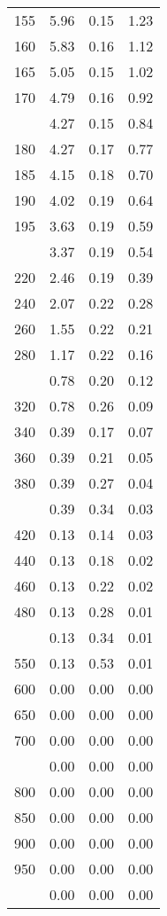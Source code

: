 \begin{table}[ht]
\begin{tabular}{lccc}
  155 & 5.96 & 0.15 & 1.23 \\ 
  160 & 5.83 & 0.16 & 1.12 \\ 
  165 & 5.05 & 0.15 & 1.02 \\ 
  170 & 4.79 & 0.16 & 0.92 \\ 
   \addlinespace
175 & 4.27 & 0.15 & 0.84 \\ 
  180 & 4.27 & 0.17 & 0.77 \\ 
  185 & 4.15 & 0.18 & 0.70 \\ 
  190 & 4.02 & 0.19 & 0.64 \\ 
  195 & 3.63 & 0.19 & 0.59 \\ 
   \addlinespace
200 & 3.37 & 0.19 & 0.54 \\ 
  220 & 2.46 & 0.19 & 0.39 \\ 
  240 & 2.07 & 0.22 & 0.28 \\ 
  260 & 1.55 & 0.22 & 0.21 \\ 
  280 & 1.17 & 0.22 & 0.16 \\ 
   \addlinespace
300 & 0.78 & 0.20 & 0.12 \\ 
  320 & 0.78 & 0.26 & 0.09 \\ 
  340 & 0.39 & 0.17 & 0.07 \\ 
  360 & 0.39 & 0.21 & 0.05 \\ 
  380 & 0.39 & 0.27 & 0.04 \\ 
   \addlinespace
400 & 0.39 & 0.34 & 0.03 \\ 
  420 & 0.13 & 0.14 & 0.03 \\ 
  440 & 0.13 & 0.18 & 0.02 \\ 
  460 & 0.13 & 0.22 & 0.02 \\ 
  480 & 0.13 & 0.28 & 0.01 \\ 
   \addlinespace
500 & 0.13 & 0.34 & 0.01 \\ 
  550 & 0.13 & 0.53 & 0.01 \\ 
  600 & 0.00 & 0.00 & 0.00 \\ 
  650 & 0.00 & 0.00 & 0.00 \\ 
  700 & 0.00 & 0.00 & 0.00 \\ 
   \addlinespace
750 & 0.00 & 0.00 & 0.00 \\ 
  800 & 0.00 & 0.00 & 0.00 \\ 
  850 & 0.00 & 0.00 & 0.00 \\ 
  900 & 0.00 & 0.00 & 0.00 \\ 
  950 & 0.00 & 0.00 & 0.00 \\ 
   \addlinespace
1000 & 0.00 & 0.00 & 0.00 \\ 
   \bottomrule
\end{tabular}
\end{table}
